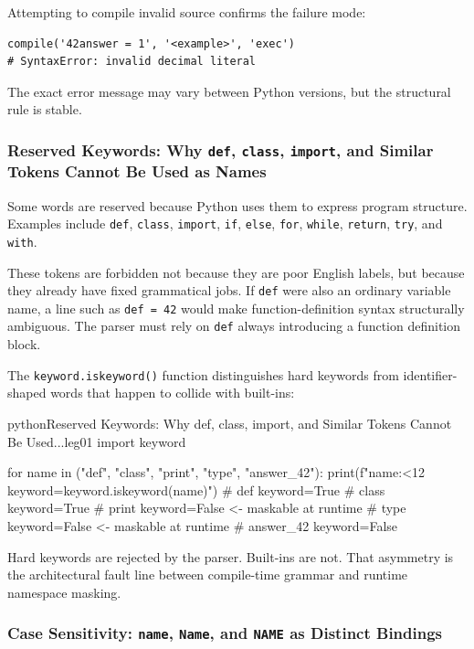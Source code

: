 Attempting to compile invalid source confirms the failure mode:

\begin{verbatim}
compile('42answer = 1', '<example>', 'exec')
# SyntaxError: invalid decimal literal
\end{verbatim}

The exact error message may vary between Python versions, but the structural rule is stable.

\subsubsection{Reserved Keywords: Why \texttt{def}, \texttt{class}, \texttt{import}, and Similar Tokens Cannot Be Used as Names}

Some words are reserved because Python uses them to express program structure. Examples include \texttt{def}, \texttt{class}, \texttt{import}, \texttt{if}, \texttt{else}, \texttt{for}, \texttt{while}, \texttt{return}, \texttt{try}, and \texttt{with}.

These tokens are forbidden not because they are poor English labels, but because they already have fixed grammatical jobs. If \texttt{def} were also an ordinary variable name, a line such as \texttt{def = 42} would make function-definition syntax structurally ambiguous. The parser must rely on \texttt{def} always introducing a function definition block.

The \texttt{keyword.iskeyword()} function distinguishes hard keywords from identifier-shaped words that happen to collide with built-ins:

\begin{codebox}[]{python}{Reserved Keywords: Why def, class, import, and Similar Tokens Cannot Be Used...}{leg01}
import keyword

for name in ("def", "class", "print", "type", "answer_42"):
    print(f"{name:<12} keyword={keyword.iskeyword(name)}")
# def          keyword=True
# class        keyword=True
# print        keyword=False   <- maskable at runtime
# type         keyword=False   <- maskable at runtime
# answer_42    keyword=False
\end{codebox}


Hard keywords are rejected by the parser. Built-ins are not. That asymmetry is the architectural fault line between compile-time grammar and runtime namespace masking.

\subsubsection{Case Sensitivity: \texttt{name}, \texttt{Name}, and \texttt{NAME} as Distinct Bindings}

